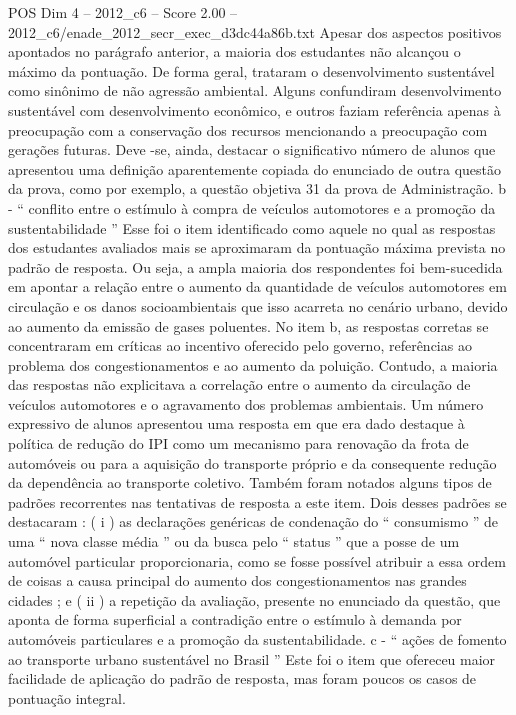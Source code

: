 \begin{textsample}{POS Dim 4 – 2012\_c6 – Score 2.00 – 2012\_c6/enade\_2012\_secr\_exec\_d3dc44a86b.txt}
Apesar dos aspectos positivos apontados no parágrafo anterior, a maioria dos estudantes não alcançou o máximo da pontuação.
De forma geral, trataram o desenvolvimento sustentável como sinônimo de não agressão ambiental.
Alguns confundiram desenvolvimento sustentável com desenvolvimento econômico, e outros faziam referência apenas à preocupação com a conservação dos recursos mencionando a preocupação com gerações futuras.
Deve -se, ainda, destacar o significativo número de alunos que apresentou uma definição aparentemente copiada do enunciado de outra questão da prova, como por exemplo, a questão objetiva 31 da prova de Administração. b - “ conflito entre o estímulo à compra de veículos automotores e a promoção da sustentabilidade ” Esse foi o item identificado como aquele no qual as respostas dos estudantes avaliados mais se aproximaram da pontuação máxima prevista no padrão de resposta.
Ou seja, a ampla maioria dos respondentes foi bem-sucedida em apontar a relação entre o aumento da quantidade de veículos automotores em circulação e os danos socioambientais que isso acarreta no cenário urbano, devido ao aumento da emissão de gases poluentes.
No item b, as respostas corretas se concentraram em críticas ao incentivo oferecido pelo governo, referências ao problema dos congestionamentos e ao aumento da poluição.
Contudo, a maioria das respostas não explicitava a correlação entre o aumento da circulação de veículos automotores e o agravamento dos problemas ambientais.
Um número expressivo de alunos apresentou uma resposta em que era dado destaque à política de redução do IPI como um mecanismo para renovação da frota de automóveis ou para a aquisição do transporte próprio e da consequente redução da dependência ao transporte coletivo.
Também foram notados alguns tipos de padrões recorrentes nas tentativas de resposta a este item.
Dois desses padrões se destacaram : ( i ) as declarações genéricas de condenação do “ consumismo ” de uma “ nova classe média ” ou da busca pelo “ status ” que a posse de um automóvel particular proporcionaria, como se fosse possível atribuir a essa ordem de coisas a causa principal do aumento dos congestionamentos nas grandes cidades ; e ( ii ) a repetição da avaliação, presente no enunciado da questão, que aponta de forma superficial a contradição entre o estímulo à demanda por automóveis particulares e a promoção da sustentabilidade. c - “ ações de fomento ao transporte urbano sustentável no Brasil ” Este foi o item que ofereceu maior facilidade de aplicação do padrão de resposta, mas foram poucos os casos de pontuação integral.

\end{textsample}
